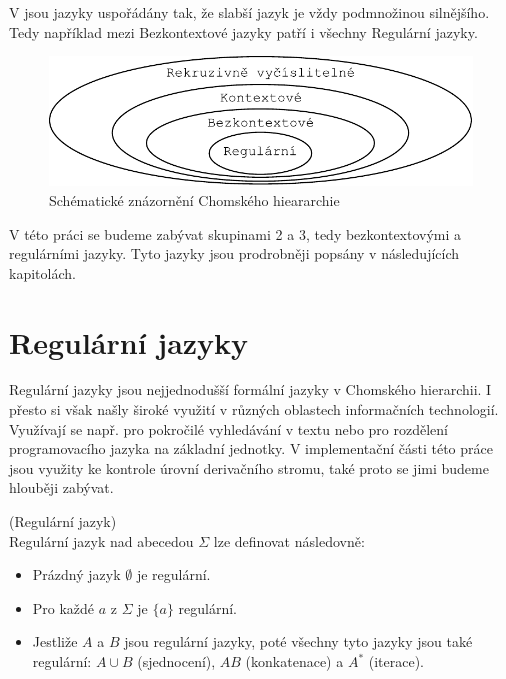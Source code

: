 V  jsou jazyky uspořádány tak, že slabší jazyk je
vždy podmnožinou silnějšího. Tedy například mezi Bezkontextové jazyky patří i
všechny Regulární jazyky.\\

\begin{figure}[H]
  \centering
  \includegraphics{fig/Chomsky.pdf}
  \caption{Schématické znázornění Chomského hieararchie}
\end{figure}


V této práci se budeme zabývat skupinami 2 a 3,
tedy bezkontextovými a regulárními jazyky. Tyto jazyky jsou prodrobněji
popsány v následujících kapitolách.

\section{Regulární jazyky}

Regulární jazyky jsou nejjednodušší formální jazyky v Chomského hierarchii.
I přesto si však našly široké využití v různých oblastech informačních technologií.
Využívají se např. pro pokročilé vyhledávání v textu nebo
pro rozdělení programovacího jazyka na základní jednotky.
V implementační části této práce jsou využity ke kontrole úrovní derivačního stromu,
také proto se jimi budeme hlouběji zabývat.

\begin{defn}
  (Regulární jazyk)\\
  Regulární jazyk nad abecedou $\Sigma$ lze definovat následovně:
  \begin{itemize}
    \item Prázdný jazyk $\emptyset$ je regulární.
    \item Pro každé $a$ z $\Sigma$ je $\{ a \}$ regulární.
    \item Jestliže $A$ a $B$ jsou regulární jazyky, poté všechny tyto jazyky jsou také regulární:
    $A \cup B$ (sjednocení), $AB$ (konkatenace) a $A^*$ (iterace).
  \end{itemize}
\end{defn}

